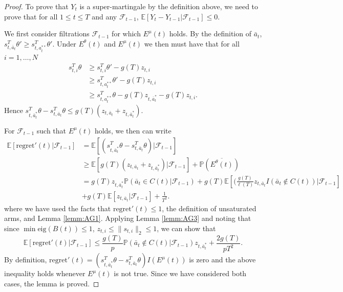 \documentclass{article}
\begin{document}
\begin{appendices}
\begin{proof}
To prove that $Y_t$ is a super-martingale by the definition above, we need to prove that for all $1\leq t\leq T$ and any $\mathcal{F}_{t-1}$, $\mathbb{E}[Y_t - Y_{t-1} | \mathcal{F}_{t-1}] \leq 0$. 

We first consider filtrations $\mathcal{F}_{t-1}$ for which $E^\mu(t)$ holds. By the definition of $\bar{a}_t$, $ s_{t,\bar{a}_t}^T \theta' \geq s_{t,{a}_t^{**}}^T \theta'$. Under $E^\theta(t)$ and $E^\mu(t)$ we then must have that for all $i = 1,\dots, N$
\begin{align*}
s_{t,i}^T \theta &\geq s_{t,i}^T \theta' - g(T) z_{t,i}\\
&\geq s_{t,{a}_t^{**}}^T \theta' - g(T)z_{t,i}\\
&\geq s_{t,{a}_t^{**}}^T \theta - g(T)z_{t,\bar{a}^*_t} - g(T) z_{t,i}.
\end{align*}
Hence $s_{t,\bar{a}^*_t}^T \theta - s_{t,\bar{a}_t}^T \theta \leq g(T)(z_{t,\bar{a}_t} + z_{t,\bar{a}^*_t})$.

For $\mathcal{F}_{t-1}$ such that $E^\mu(t)$ holds, we then can write
\begin{align*}
\mathbb{E}[\mathrm{regret}'(t) | \mathcal{F}_{t-1}] &= \mathbb{E}[ (s_{t,\bar{a}^*_t}^T \theta - s_{t,\bar{a}_t}^T \theta) | \mathcal{F}_{t-1}]\\
&\geq \mathbb{E}[g(T)(z_{t,\bar{a}_t} + z_{t,\bar{a}^*_t})|\mathcal{F}_{t-1}] + \mathbb{P}(\overline{E^\theta(t)})\\
&= g(T)z_{t,\bar{a}^*_t} \mathbb{P}(\bar{a}_t \in C(t)|\mathcal{F}_{t-1}) + g(T) \mathbb{E}\left[(\frac{g(T)}{\ell(T)} z_{t,\bar{a}_t}I(\bar{a}_t \notin C(t))|\mathcal{F}_{t-1}\right] \\&+ g(T) \mathbb{E}[z_{t,\bar{a}_t} | \mathcal{F}_{t-1}] + \frac{1}{T^2}.
\end{align*}
where we have used the facts that $\mathrm{regret}'(t) \leq 1$, the definition of unsaturated arms, and Lemma \ref{lemm:AG1}. Applying Lemma \ref{lemm:AG3} and noting that since $\min \mathrm{eig}(B(t)) \leq 1$, $z_{t,i} \leq \|s_{t,i}\|_2 \leq 1$, we can show that
\begin{equation}\label{eq:2}
\mathbb{E}[\mathrm{regret}'(t) | \mathcal{F}_{t-1}] \leq \frac{g(T)}{p} \mathbb{P}(\bar{a}_t \notin C(t) | \mathcal{F}_{t-1}) z_{t,\bar{a}^*_t} + \frac{2 g(T)}{pT^2}.
\end{equation}
By definition, $\mathrm{regret}'(t) = (s_{t,\bar{a}^*_t}^T \theta - s_{t,\bar{a}_t}^T \theta)I(E^\mu(t))$ is zero and the above inequality holds whenever $E^\mu(t)$ is not true. Since we have considered both cases, the lemma is proved.



\end{proof}
\end{appendices}
\end{document}
